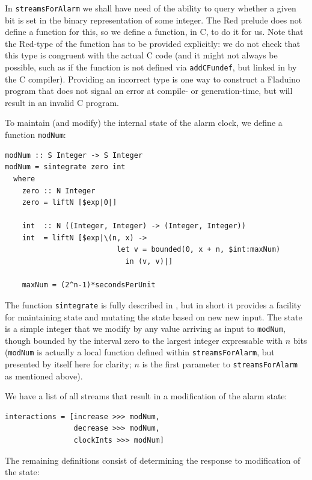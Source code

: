 \documentclass[a4paper, oneside, final]{memoir}
\let\Fref\undefined
\begin{document}
In \texttt{streamsForAlarm} we shall have need of the ability to query
whether a given bit is set in the binary representation of some
integer.  The Red prelude does not define a function for this, so we
define a function, in C, to do it for us.  Note that the Red-type of
the function has to be provided explicitly: we do not check that this
type is congruent with the actual C code (and it might not always be
possible, such as if the function is not defined via
\texttt{addCFundef}, but linked in by the C compiler).  Providing an
incorrect type is one way to construct a Fladuino program that does
not signal an error at compile- or generation-time, but will result in
an invalid C program.

To maintain (and modify) the internal state of the alarm clock, we
define a function \texttt{modNum}:

\begin{verbatim}
modNum :: S Integer -> S Integer
modNum = sintegrate zero int
  where
    zero :: N Integer
    zero = liftN [$exp|0|]

    int  :: N ((Integer, Integer) -> (Integer, Integer))
    int  = liftN [$exp|\(n, x) -> 
                          let v = bounded(0, x + n, $int:maxNum)
                            in (v, v)|]
      
    maxNum = (2^n-1)*secondsPerUnit
\end{verbatim}

The function \texttt{sintegrate} is fully described in
\Fref{sec:streamoperators}, but in short it provides a facility for
maintaining state and mutating the state based on new new input.  The
state is a simple integer that we modify by any value arriving as
input to \texttt{modNum}, though bounded by the interval zero to the
largest integer expressable with $n$ bits (\texttt{modNum} is actually
a local function defined within \texttt{streamsForAlarm}, but
presented by itself here for clarity; $n$ is the first parameter to
\texttt{streamsForAlarm} as mentioned above).

We have a list of all streams that result in a modification of the
alarm state:

\begin{verbatim}
interactions = [increase >>> modNum,
                decrease >>> modNum,
                clockInts >>> modNum]
\end{verbatim}

The remaining definitions consist of determining the response to
modification of the state:
\end{document}
